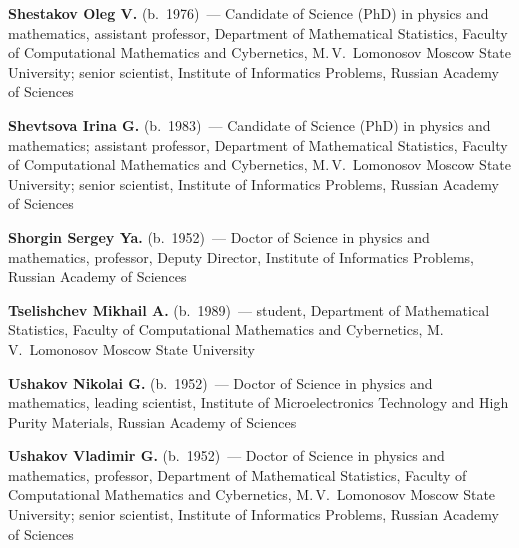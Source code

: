 \begin{multicols}{2}
\noindent 
\textbf{Shestakov Oleg V.} (b.\ 1976)~--- Candidate of Science (PhD) in physics and mathematics,
assistant professor, Department of Mathematical Statistics, Faculty of Computational Mathematics and Cybernetics,
M.\,V.~Lomonosov Moscow State University; senior scientist, Institute of Informatics Problems, 
Russian Academy of Sciences

\vspace*{6pt}

\noindent
\textbf{Shevtsova Irina G.} (b.\ 1983)~--- Candidate of Science (PhD) in physics and mathematics; 
assistant professor, Department of Mathematical Statistics, 
Faculty of Computational Mathematics and Cybernetics, M.\,V.~Lomonosov 
Moscow State University;  senior scientist, Institute of Informatics Problems, 
Russian Academy of Sciences

\vspace*{6pt}

\noindent
\textbf{Shorgin Sergey Ya.} (b.\ 1952)~--- Doctor of Science in physics and 
mathematics, professor, Deputy Director, Institute of Informatics Problems, 
Russian Academy of Sciences

\vspace*{6pt}

\noindent
\textbf{Tselishchev Mikhail A.} (b.\ 1989)~--- student,  Department of Mathematical 
Statistics, Faculty of Computational Mathematics and Cybernetics, 
M.\,V.~Lomonosov Moscow State University 

\vspace*{6pt}

\noindent 
\textbf{Ushakov Nikolai G.} (b.\ 1952)~--- Doctor of Science in physics and mathematics,
leading scientist, Institute of Microelectronics Technology and High Purity Materials,
Russian Academy of Sciences

\vspace*{6pt}


\noindent 
\textbf{Ushakov Vladimir G.} (b.\ 1952)~--- Doctor of Science in physics and mathematics,
professor, Department of Mathematical Statistics, Faculty of Computational Mathematics and Cybernetics,
M.\,V.~Lomonosov Moscow State University; senior scientist, Institute of Informatics Problems, 
Russian Academy of Sciences

\def\rightheadline{\underline{\noindent\hbox to \textwidth{\hfill\small ABOUT AUTHORS
}}}
\def\leftheadline{\underline{\noindent\parbox{\textwidth}{
\small\textrm{ABOUT AUTHORS}\hfill}}}
\def\leftfootline{\small{\textbf{\thepage}
\hfill ИНФОРМАТИКА И ЕЁ ПРИМЕНЕНИЯ\ \ \ том~5\ \ \ выпуск~3\ \ \ 2011}
}%
 \def\rightfootline{\small{ИНФОРМАТИКА И ЕЁ ПРИМЕНЕНИЯ\ \ \ том~5\ \ \ выпуск~3\ \ \ 2011
\hfill \textbf{\thepage}}}


\end{multicols}
